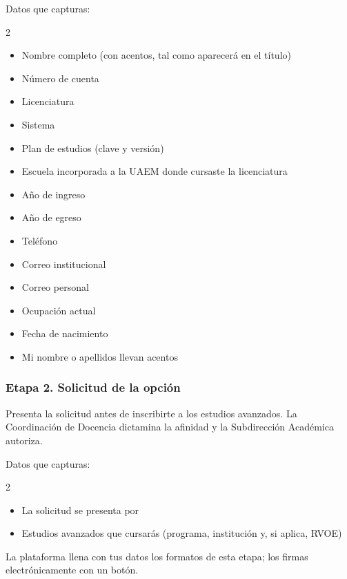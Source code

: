 Datos que capturas:
\begin{multicols}{2}\small
\begin{itemize}
  \item Nombre completo (con acentos, tal como aparecerá en el título)
  \item Número de cuenta
  \item Licenciatura
  \item Sistema
  \item Plan de estudios (clave y versión)
  \item Escuela incorporada a la UAEM donde cursaste la licenciatura
  \item Año de ingreso
  \item Año de egreso
  \item Teléfono
  \item Correo institucional
  \item Correo personal
  \item Ocupación actual
  \item Fecha de nacimiento
  \item Mi nombre o apellidos llevan acentos
\end{itemize}
\end{multicols}
\subsubsection*{Etapa 2. Solicitud de la opción}
Presenta la solicitud antes de inscribirte a los estudios avanzados. La Coordinación de Docencia dictamina la afinidad y la Subdirección Académica autoriza.

Datos que capturas:
\begin{multicols}{2}\small
\begin{itemize}
  \item La solicitud se presenta por
  \item Estudios avanzados que cursarás (programa, institución y, si aplica, RVOE)
\end{itemize}
\end{multicols}

La plataforma llena con tus datos los formatos de esta etapa; los firmas electrónicamente con un botón.

